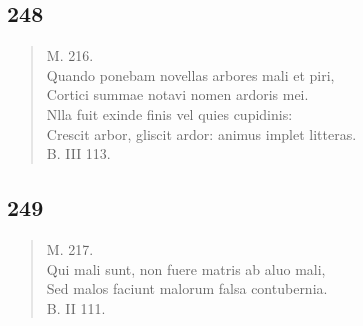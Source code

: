 \documentclass[11pt, a4paper]{report}
\begin{document}
            \subsection*{248}
      \begin{verse}
      M. 216. \\ Quando ponebam novellas arbores mali et piri, \\ Cortici summae notavi nomen ardoris mei. \\ Nlla fuit exinde finis vel quies cupidinis: \\ Crescit arbor, gliscit ardor: animus implet litteras. \\ B. III 113. \\ 
      \end{verse}
  
            \subsection*{249}
      \begin{verse}
      M. 217. \\ Qui mali sunt, non fuere matris ab aluo mali, \\ Sed malos faciunt malorum falsa contubernia. \\ B. II 111. \\ 
      \end{verse}
  
\end{document}
